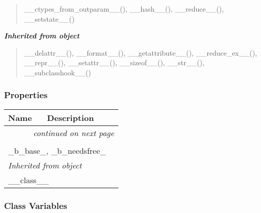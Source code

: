 \begin{quote}
\_\_ctypes\_from\_outparam\_\_(), \_\_hash\_\_(), \_\_reduce\_\_(), \_\_setstate\_\_()
\end{quote}

\large{\textbf{\textit{Inherited from object}}}

\begin{quote}
\_\_delattr\_\_(), \_\_format\_\_(), \_\_getattribute\_\_(), \_\_reduce\_ex\_\_(), \_\_repr\_\_(), \_\_setattr\_\_(), \_\_sizeof\_\_(), \_\_str\_\_(), \_\_subclasshook\_\_()
\end{quote}


  \subsubsection{Properties}

    \vspace{-1cm}
\hspace{\varindent}\begin{longtable}{|p{\varnamewidth}|p{\vardescrwidth}|l}
\cline{1-2}
\cline{1-2} \centering \textbf{Name} & \centering \textbf{Description}& \\
\cline{1-2}
\endhead\cline{1-2}\multicolumn{3}{r}{\small\textit{continued on next page}}\\\endfoot\cline{1-2}
\endlastfoot\multicolumn{2}{|l|}{\textit{Inherited from ??.\_CData}}\\
\multicolumn{2}{|p{\varwidth}|}{\raggedright \_b\_base\_, \_b\_needsfree\_}\\
\cline{1-2}
\multicolumn{2}{|l|}{\textit{Inherited from object}}\\
\multicolumn{2}{|p{\varwidth}|}{\raggedright \_\_class\_\_}\\
\cline{1-2}
\end{longtable}



  \subsubsection{Class Variables}

